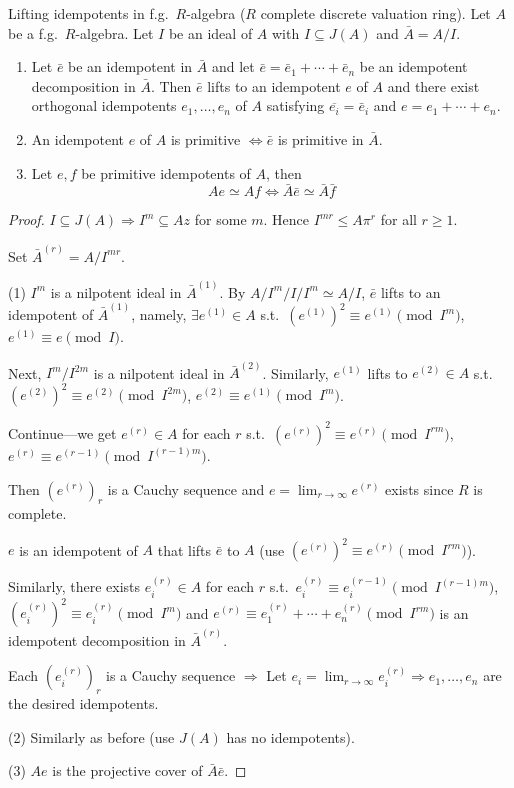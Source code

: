 \documentclass[11pt, a4paper]{report}
\begin{document}
\begin{theorem}
Lifting idempotents in f.g.\ $R$-algebra ($R$ complete discrete valuation ring). Let $A$ be a f.g.\ $R$-algebra. Let $I$ be an ideal of $A$ with $I \subseteq J(A)$ and $\bar{A}=A / I$.

\begin{enumerate}
\item Let $\bar{e}$ be an idempotent in $\bar{A}$ and let $\bar{e}=\bar{e}_{1}+\cdots+\bar{e}_{n}$ be an idempotent decomposition in $\bar{A}$. Then $\bar{e}$ lifts to an idempotent $e$ of $A$ and there exist orthogonal idempotents $e_{1}, \ldots, e_{n}$ of $A$ satisfying $\overline{e_{i}}=\bar{e}_{i}$ and $e=e_{1}+\cdots+e_{n}$.
\item An idempotent $e$ of $A$ is primitive $\Leftrightarrow \bar{e}$ is primitive in $\bar{A}$.
\item Let $e, f$ be primitive idempotents of $A$, then
\[
Ae \simeq Af \Leftrightarrow \bar{A}\bar{e} \simeq \bar{A}\bar{f}
\]
\end{enumerate}

\end{theorem}

\begin{proof}
$I \subseteq J(A) \Rightarrow I^{m} \subseteq Az$ for some $m$. Hence $I^{mr} \leqslant A\pi^{r}$ for all $r \geqslant 1$.

Set $\bar{A}^{(r)} = A/I^{mr}$.

(1) $I^{m}$ is a nilpotent ideal in $\bar{A}^{(1)}$. By $A/I^{m}/I/I^{m} \simeq A/I$, $\bar{e}$ lifts to an idempotent of $\bar{A}^{(1)}$, namely, $\exists e^{(1)} \in A$ s.t.\ $\left(e^{(1)}\right)^{2} \equiv e^{(1)} \pmod{I^{m}}$, $e^{(1)} \equiv e \pmod{I}$.

Next, $I^{m}/I^{2m}$ is a nilpotent ideal in $\bar{A}^{(2)}$. Similarly, $e^{(1)}$ lifts to $e^{(2)} \in A$ s.t.\ $\left(e^{(2)}\right)^{2} \equiv e^{(2)} \pmod{I^{2m}}$, $e^{(2)} \equiv e^{(1)} \pmod{I^{m}}$.

Continue—we get $e^{(r)} \in A$ for each $r$ s.t.\ $\left(e^{(r)}\right)^{2} \equiv e^{(r)} \pmod{I^{rm}}$, $e^{(r)} \equiv e^{(r-1)} \pmod{I^{(r-1)m}}$.

Then $\left(e^{(r)}\right)_{r}$ is a Cauchy sequence and $e = \lim_{r \to \infty} e^{(r)}$ exists since $R$ is complete.

$e$ is an idempotent of $A$ that lifts $\bar{e}$ to $A$ (use $\left(e^{(r)}\right)^{2} \equiv e^{(r)} \pmod{I^{rm}}$).

Similarly, there exists $e_{i}^{(r)} \in A$ for each $r$ s.t.\ $e_{i}^{(r)} \equiv e_{i}^{(r-1)} \pmod{I^{(r-1)m}}$, $\left(e_{i}^{(r)}\right)^{2} \equiv e_{i}^{(r)} \pmod{I^{m}}$ and $e^{(r)} \equiv e_{1}^{(r)} + \cdots + e_{n}^{(r)} \pmod{I^{rm}}$ is an idempotent decomposition in $\bar{A}^{(r)}$.

Each $\left(e_{i}^{(r)}\right)_{r}$ is a Cauchy sequence $\Rightarrow$ Let $e_{i} = \lim_{r \to \infty} e_{i}^{(r)} \Rightarrow e_{1}, \ldots, e_{n}$ are the desired idempotents.

(2) Similarly as before (use $J(A)$ has no idempotents).

(3) $Ae$ is the projective cover of $\bar{A}\bar{e}$.
\end{proof}
\end{document}
